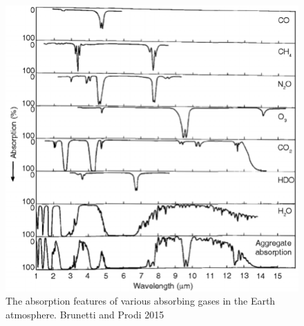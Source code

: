 \documentclass[a4paper, 12pt, twoside]{article}
\begin{document}
\begin{figure}[t!]
\center
\includegraphics[width=0.7\linewidth]{Figure/Infrared-absorption-spectra-for-various-atmospheric-gases.png}
\caption{The absorption features of various absorbing gases in the Earth atmosphere. Brunetti and Prodi 2015\cite{Brunetti2015}}
\label{fig:atmospheric_absorption}
\end{figure}
\end{document}
